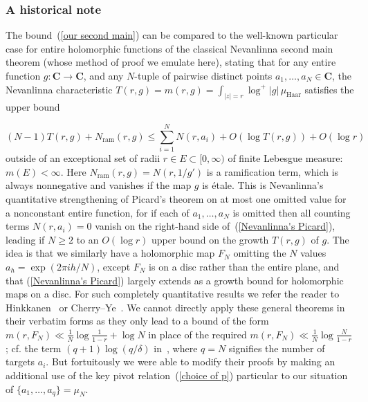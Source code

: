 \documentclass[10pt]{amsart}
\theoremstyle{remark}
\numberwithin{equation}{subsection}
\def\numequation{\addtocounter{subsubsection}{1}\begin{equation}}
\def\C{\mathbf{C}}
\begin{document}
\subsubsection{A historical note}   \label{some Nevanlinna background}
The bound~(\ref{our second main}) can be compared to the well-known
particular case for entire holomorphic functions of the classical Nevanlinna second main theorem (whose method of proof
we emulate here), stating that for any entire function $g : \C \to \C$, and any $N$-tuple of pairwise distinct points 
$a_1, \ldots, a_N \in \C$, the Nevanlinna characteristic $T(r,g) = m(r,g) = \int_{|z| = r} \log^+{|g|} \, \mu_{\mathrm{Haar}}$  satisfies the upper bound
\numequation \label{Nevanlinna's Picard}
(N-1) T(r, g)  + N_{\mathrm{ram}}(r, g)   \leq \sum_{i=1}^N N(r, a_i) + O(\log{T(r,g)}) + O( \log{r} )
\end{equation}
outside of an exceptional set of radii $r \in E \subset [0,\infty)$ of finite Lebesgue measure: $m(E) < \infty$. 
Here $N_{\mathrm{ram}}(r, g) = N(r, 1/g')$ is a ramification term, which is always nonnegative and vanishes if the map $g$ is \'etale. This is Nevanlinna's quantitative strengthening of Picard's theorem on at most one omitted value for a nonconstant entire function, for if each of $a_1, \ldots, a_N$ is omitted then all counting terms $N(r, a_i) = 0$ vanish on the right-hand side of~(\ref{Nevanlinna's Picard}),
leading if $N \geq 2$ to an $O(\log{r})$ upper bound on the growth $T(r,g)$ of $g$. 
The idea is that we similarly have a holomorphic map $F_N$ omitting the $N$ values $a_h = \exp(2\pi i h/N)$, except $F_N$ is on a disc rather than the entire plane, and that (\ref{Nevanlinna's Picard}) largely extends as a growth bound for holomorphic maps on a disc. For such completely quantitative results we refer the reader to Hinkkanen~\cite[Theorem 3]{Hinkkanen} or Cherry--Ye~\cite[Theorem~4.2.1 or Theorem~2.8.6]{CherryYe}. We cannot directly apply these general theorems in their verbatim forms as they only lead to a bound of the form $m(r, F_N) \ll  \frac{1}{N}\log{\frac{1}{1-r}} + \log{N}$ in place of the required $m(r,F_N) \ll \frac{1}{N} \log{\frac{N}{1-r}}$; cf. the term $(q+1)\log(q/\delta)$ in~\cite[line~(1.24)]{Hinkkanen}, where $q = N$ signifies the number of targets $a_i$. But fortuitously we were able to modify their proofs by making an additional use of the key pivot relation~(\ref{choice of p}) particular to our situation of $\{a_1, \ldots, a_q\} = \mu_N$. 
\end{document}
